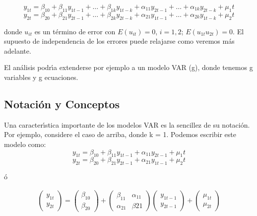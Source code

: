 		\begin{equation*}
		y_{1t} = \beta_{10} + \beta_{11} y_{1t-1} + \dots{} +  \beta_{1k} y_{1t-k} + \alpha_{11} y_{2t-1} + \dots{} +  \alpha_{1k} y_{2t-k} + \mu_1t
		\end{equation*}
		\begin{equation*}
		y_{2t} = \beta_{20} + \beta_{21} y_{2t-1} + \dots{} +  \beta_{2k} y_{2t-k} + \alpha_{21} y_{1t-1} + \dots{} +  \alpha_{2k} y_{1t-k} + \mu_2t
		\end{equation*}
		
		donde $u_{it}$ es un t\'ermino de error con $E(u_{it})=0$, $i =1,2$; $E(u_{1t} u_{2t})=0$. El supuesto de independencia de los errores puede relajarse como veremos m\'as adelante.
		
		El an\'alisis podr\'{\i}a extenderse por ejemplo a un modelo VAR (g), donde tenemos g variables y g ecuaciones.
		
\pagebreak\subsection{Notaci\'on y Conceptos}
		Una caracter\'{\i}stica importante de los modelos VAR es la sencillez de su notaci\'on. Por ejemplo, considere el caso de arriba, donde k = 1. Podemos escribir este modelo como:
		\begin{equation*}
		y_{1t} = \beta_{10} + \beta_{11} y_{1t-1} + \alpha_{11} y_{2t-1} + \mu_1t
		\end{equation*}
		\begin{equation*}
		y_{2t} = \beta_{20} + \beta_{21} y_{2t-1} + \alpha_{21} y_{1t-1} + \mu_2t
		\end{equation*}
		
		\'o
		
		\begin{gather}
		\begin{pmatrix} y_{1t} \\ y_{2t} \end{pmatrix}
		=
		\begin{pmatrix} \beta_{10} \\ \beta_{20} \end{pmatrix}
		+
		\begin{pmatrix} \beta_{11} & \alpha_{11} \\ \alpha_{21} & \beta{21} \end{pmatrix}
		\begin{pmatrix} y_{1t-1} \\ y_{2t-1} \end{pmatrix}
		+
		\begin{pmatrix} \mu_{1t} \\ \mu_{2t} \end{pmatrix}
		\end{gather}
		
